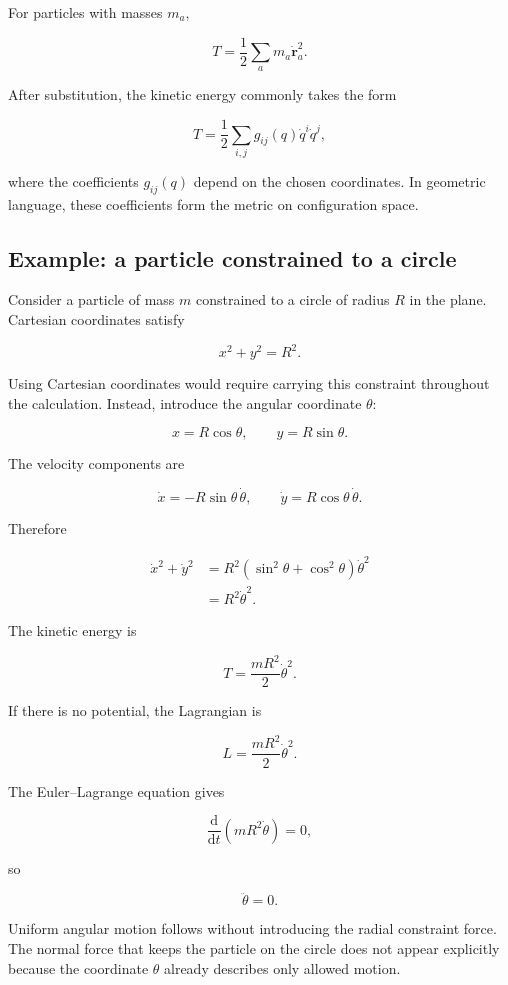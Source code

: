 For particles with masses \(m_{a}\),

\[
T
=
\frac{1}{2}
\sum_{a}m_{a}
\dot{\mathbf{r}}_{a}^{2}.
\]

After substitution, the kinetic energy commonly takes the form

\[
T
=
\frac{1}{2}
\sum_{i,j}
g_{ij}(q)
\dot q^{i}\dot q^{j},
\]

where the coefficients \(g_{ij}(q)\) depend on the chosen coordinates. In geometric language, these coefficients form the metric on configuration space.

\subsection{Example: a particle constrained to a circle}

Consider a particle of mass \(m\) constrained to a circle of radius \(R\) in the plane. Cartesian coordinates satisfy

\[
x^{2}+y^{2}=R^{2}.
\]

Using Cartesian coordinates would require carrying this constraint throughout the calculation. Instead, introduce the angular coordinate \(\theta\):

\[
x=R\cos\theta,
\qquad
y=R\sin\theta.
\]

The velocity components are

\[
\dot x=-R\sin\theta\,\dot\theta,
\qquad
\dot y=R\cos\theta\,\dot\theta.
\]

Therefore

\[
\begin{aligned}
\dot x^{2}+\dot y^{2}
&=
R^{2}
\left(
\sin^{2}\theta+
\cos^{2}\theta
\right)
\dot\theta^{2}\\
&=
R^{2}\dot\theta^{2}.
\end{aligned}
\]

The kinetic energy is

\[
T
=
\frac{mR^{2}}{2}\dot\theta^{2}.
\]

If there is no potential, the Lagrangian is

\[
L
=
\frac{mR^{2}}{2}\dot\theta^{2}.
\]

The Euler--Lagrange equation gives

\[
\frac{\mathrm{d}}{\mathrm{d}t}
\left(mR^{2}\dot\theta\right)
=0,
\]

so

\[
\ddot\theta=0.
\]

Uniform angular motion follows without introducing the radial constraint force. The normal force that keeps the particle on the circle does not appear explicitly because the coordinate \(\theta\) already describes only allowed motion.

